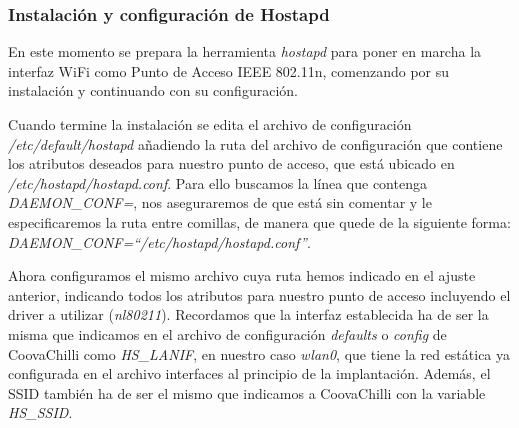 
\subsubsection{Instalación y configuración de Hostapd} \label{HostapdInstallConfig}

En este momento se prepara la herramienta \emph{hostapd} para poner en marcha la interfaz WiFi como Punto de Acceso IEEE 802.11n, comenzando por su instalación y continuando con su configuración.


Cuando termine la instalación se edita el archivo de configuración \emph{/etc/default/hostapd} añadiendo la ruta del archivo de configuración que contiene los atributos deseados para nuestro punto de acceso, que está ubicado en \emph{/etc/hostapd/hostapd.conf}. Para ello buscamos la línea que contenga \emph{DAEMON\_CONF=}, nos aseguraremos de que está sin comentar y le especificaremos la ruta entre comillas, de manera que quede de la siguiente forma: \emph{DAEMON\_CONF=``/etc/hostapd/hostapd.conf''}.

Ahora configuramos el mismo archivo cuya ruta hemos indicado en el ajuste anterior, indicando todos los atributos para nuestro punto de acceso incluyendo el driver a utilizar (\emph{nl80211}). Recordamos que la interfaz establecida ha de ser la misma que indicamos en el archivo de configuración \emph{defaults} o \emph{config} de CoovaChilli como \emph{HS\_LANIF}, en nuestro caso \emph{wlan0}, que tiene la red estática ya configurada en el archivo interfaces al principio de la implantación. Además, el SSID también ha de ser el mismo que indicamos a CoovaChilli con la variable \emph{HS\_SSID}.

